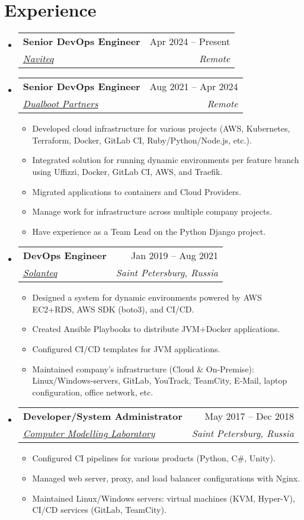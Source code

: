 \documentclass[a4paper,10pt]{article}
\makeatletter
\newcommand{\resumeItem}[1]{
  \item\small{#1}
}
\newcommand{\resumeItemListStart}{\begin{itemize}[rightmargin=0.11in]}
\newcommand{\resumeItemListEnd}{\end{itemize}}
\newcommand{\resumeQuadHeading}[4]{
  \item
  \begin{tabular*}{0.96\textwidth}[t]{l@{\extracolsep{\fill}}r}
    \textbf{#1} & #2 \\
    \textit{\small#3} & \textit{\small #4} \\
  \end{tabular*}
}
\newcommand{\resumeHeadingListStart}{
  \begin{itemize}[leftmargin=0.15in, label={}]
}
\newcommand{\resumeHeadingListEnd}{\end{itemize}}
\newcommand{\hrefUline}[2]{
  \href{#1}{\uline{#2}}
}
\makeatother
\begin{document}

\section{Experience}
\resumeHeadingListStart{}
  \resumeQuadHeading{Senior DevOps Engineer}{Apr 2024 -- Present}
  {\hrefUline{https://www.linkedin.com/company/naviteq-solutions/}{Naviteq}}{Remote}

  \resumeQuadHeading{Senior DevOps Engineer}{Aug 2021 -- Apr 2024}
  {\hrefUline{https://www.linkedin.com/company/dualbootpartners/}{Dualboot Partners}}{Remote}
  \resumeItemListStart{}
    \resumeItem{Developed cloud infrastructure for various projects (AWS, Kubernetes, Terraform, Docker, GitLab CI, Ruby/Python/Node.js, etc.).}
    \resumeItem{Integrated solution for running dynamic environments per feature branch using Uffizzi, Docker, GitLab CI, AWS, and Traefik.}
    \resumeItem{Migrated applications to containers and Cloud Providers.}
    \resumeItem{Manage work for infrastructure across multiple company projects.}
    \resumeItem{Have experience as a Team Lead on the Python Django project.}
  \resumeItemListEnd{}

  \resumeQuadHeading{DevOps Engineer}{Jan 2019 -- Aug 2021}
  {\hrefUline{https://www.linkedin.com/company/solanteq/}{Solanteq}}{Saint Petersburg, Russia}
    \resumeItemListStart{}
      \resumeItem{Designed a system for dynamic environments powered by AWS EC2+RDS, AWS SDK (boto3), and CI/CD.}
      \resumeItem{Created Ansible Playbooks to distribute JVM+Docker applications.}
      \resumeItem{Configured CI/CD templates for JVM applications.}
      \resumeItem{Maintained company's infrastructure (Cloud \& On-Premise): Linux/Windows-servers, GitLab, YouTrack, TeamCity, E-Mail, laptop configuration, office network, etc.}
    \resumeItemListEnd{}

  \resumeQuadHeading{Developer/System Administrator}{May 2017 -- Dec 2018}
  {\hrefUline{https://sim-lab.ru}{Computer Modelling Laboratory}}{Saint Petersburg, Russia}
    \resumeItemListStart{}
      \resumeItem{Configured CI pipelines for various products (Python, C\#, Unity).}
      \resumeItem{Managed web server, proxy, and load balancer configurations with Nginx.}
      \resumeItem{Maintained Linux/Windows servers: virtual machines (KVM, Hyper-V), CI/CD services (GitLab, TeamCity).}
    \resumeItemListEnd{}
\resumeHeadingListEnd{}
\end{document}
